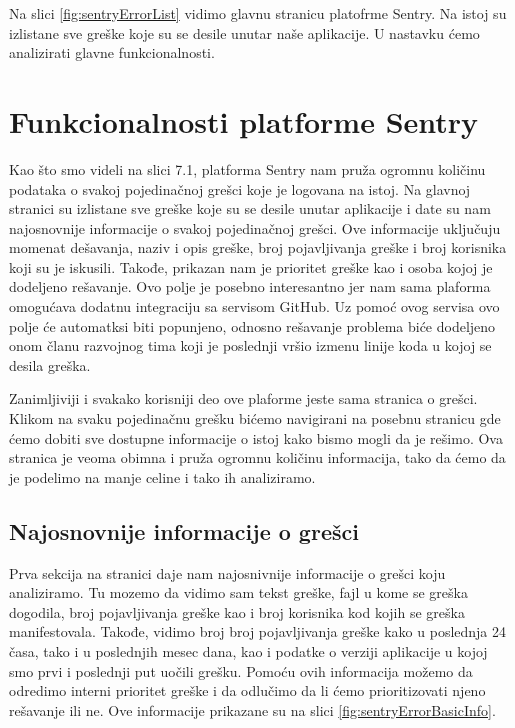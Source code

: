 \documentclass[12pt,oneside]{memoir}
\begin{document}
Na slici \ref{fig:sentryErrorList} vidimo glavnu stranicu platofrme Sentry. Na istoj su izlistane sve greške koje su se desile unutar naše aplikacije. U nastavku ćemo analizirati glavne funkcionalnosti.

\section{Funkcionalnosti platforme Sentry}

Kao što smo videli na slici 7.1, platforma Sentry nam pruža ogromnu količinu podataka o svakoj pojedinačnoj grešci koje je logovana na istoj. Na glavnoj stranici su izlistane sve greške koje su se desile unutar aplikacije i date su nam najosnovnije informacije o svakoj pojedinačnoj grešci. Ove informacije uključuju momenat dešavanja, naziv i opis greške, broj pojavljivanja greške i broj korisnika koji su je iskusili. Takođe, prikazan nam je prioritet greške kao i osoba kojoj je dodeljeno rešavanje. Ovo polje je posebno interesantno jer nam sama plaforma omogućava dodatnu integraciju sa servisom GitHub. Uz pomoć ovog servisa ovo polje će automatksi biti popunjeno, odnosno rešavanje problema biće dodeljeno onom članu razvojnog tima koji je poslednji vršio izmenu linije koda u kojoj se desila greška. \newline

Zanimljiviji i svakako korisniji deo ove plaforme jeste sama stranica o grešci. Klikom na svaku pojedinačnu grešku bićemo navigirani na posebnu stranicu gde ćemo dobiti sve dostupne informacije o istoj kako bismo mogli da je rešimo. Ova stranica je veoma obimna i pruža ogromnu količinu informacija, tako da ćemo da je podelimo na manje celine i tako ih analiziramo.

\subsection{Najosnovnije informacije o grešci}

Prva sekcija na stranici daje nam najosnivnije informacije o grešci koju analiziramo. Tu mozemo da vidimo sam tekst greške, fajl u kome se greška dogodila, broj pojavljivanja greške kao i broj korisnika kod kojih se greška manifestovala. Takođe, vidimo broj broj pojavljivanja greške kako u poslednja 24 časa, tako i u poslednjih mesec dana, kao i podatke o verziji aplikacije u kojoj smo prvi i poslednji put uočili grešku. Pomoću ovih informacija možemo da odredimo interni prioritet greške i da odlučimo da li ćemo prioritizovati njeno rešavanje ili ne. Ove informacije prikazane su na slici \ref{fig:sentryErrorBasicInfo}.
\end{document}
